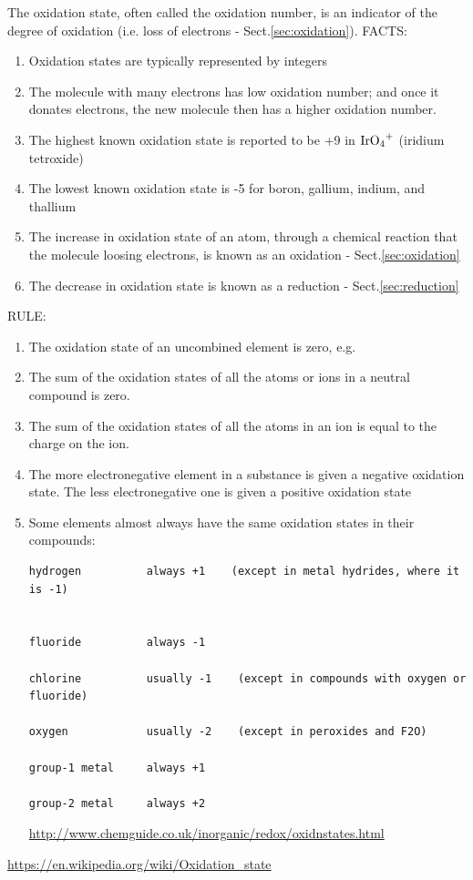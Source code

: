 The oxidation state, often called the oxidation number, is an indicator of the
degree of oxidation (i.e. loss of electrons - Sect.\ref{sec:oxidation}).
FACTS:
\begin{enumerate}
  \item Oxidation states are typically represented by integers

  \item The molecule with many electrons has low oxidation number; and once it
  donates electrons, the new molecule then has a higher oxidation number.
   
  \item  The highest known oxidation state is reported to be +9 in
  $\ce{IrO_4^+}$ (iridium tetroxide)

  \item The lowest known oxidation state is -5 for boron, gallium, indium, and
  thallium

  \item The increase in oxidation state of an atom, through a chemical reaction
  that the molecule loosing electrons, is known as an oxidation -
  Sect.\ref{sec:oxidation}

  \item The decrease in oxidation state is known as a reduction -
  Sect.\ref{sec:reduction}
\end{enumerate}

RULE:
\begin{enumerate}
  \item  The oxidation state of an uncombined element is zero, e.g.


  \item The sum of the oxidation states of all the atoms or ions in a neutral
  compound is zero.

  \item The sum of the oxidation states of all the atoms in an ion is equal to
  the charge on the ion.

  \item The more electronegative element in a substance is given a negative
  oxidation state. The less electronegative one is given a positive oxidation state

  \item Some elements almost always have the same oxidation states in their
  compounds:

{\tiny
\begin{verbatim}
hydrogen          always +1    (except in metal hydrides, where it is -1)


fluoride          always -1

chlorine          usually -1    (except in compounds with oxygen or fluoride)

oxygen            usually -2    (except in peroxides and F2O)

group-1 metal     always +1

group-2 metal     always +2
\end{verbatim}
}
\url{http://www.chemguide.co.uk/inorganic/redox/oxidnstates.html}
\end{enumerate}
\url{https://en.wikipedia.org/wiki/Oxidation_state}

